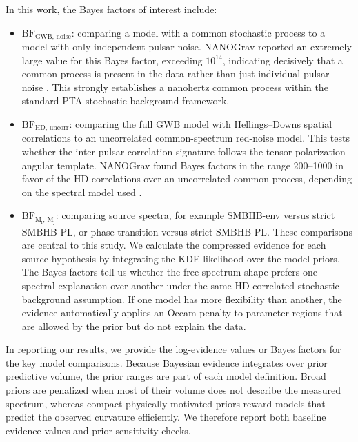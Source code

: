 \documentclass[symmetry,article,submit,pdftex,moreauthors]{Definitions/mdpi}
\begin{document}
In this work, the Bayes factors of interest include:
\begin{itemize}
    \item $\mathrm{BF}_{\mathrm{GWB,\,noise}}$: comparing a model with a common stochastic process to a model with only independent pulsar noise. NANOGrav reported an extremely large value for this Bayes factor, exceeding $10^{14}$, indicating decisively that a common process is present in the data rather than just individual pulsar noise \cite{NANOGrav15-Evidence}. This strongly establishes a nanohertz common process within the standard PTA stochastic-background framework.
    \item $\mathrm{BF}_{\mathrm{HD,\,uncorr}}$: comparing the full GWB model with Hellings--Downs spatial correlations to an uncorrelated common-spectrum red-noise model. This tests whether the inter-pulsar correlation signature follows the tensor-polarization angular template. NANOGrav found Bayes factors in the range 200--1000 in favor of the HD correlations over an uncorrelated common process, depending on the spectral model used \cite{NANOGrav15-Evidence}.
    \item $\mathrm{BF}_{\mathrm{M_i,\,M_j}}$: comparing source spectra, for example SMBHB-env versus strict SMBHB-PL, or phase transition versus strict SMBHB-PL. These comparisons are central to this study. We calculate the compressed evidence for each source hypothesis by integrating the KDE likelihood over the model priors. The Bayes factors tell us whether the free-spectrum shape prefers one spectral explanation over another under the same HD-correlated stochastic-background assumption. If one model has more flexibility than another, the evidence automatically applies an Occam penalty to parameter regions that are allowed by the prior but do not explain the data.
\end{itemize}

In reporting our results, we provide the log-evidence values or Bayes factors for the key model comparisons. Because Bayesian evidence integrates over prior predictive volume, the prior ranges are part of each model definition. Broad priors are penalized when most of their volume does not describe the measured spectrum, whereas compact physically motivated priors reward models that predict the observed curvature efficiently. We therefore report both baseline evidence values and prior-sensitivity checks.
\end{document}
